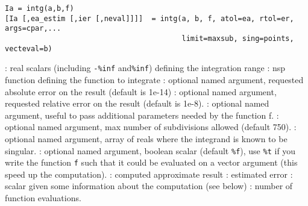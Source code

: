 
\begin{mandesc}
\end{mandesc}

\begin{calling_sequence}
\begin{verbatim}
Ia = intg(a,b,f)
[Ia [,ea_estim [,ier [,neval]]]]  = intg(a, b, f, atol=ea, rtol=er, args=cpar,... 
                                         limit=maxsub, sing=points, vecteval=b)
\end{verbatim}
\end{calling_sequence}
\begin{parameters}
  \begin{varlist}
    :  real scalars (including \verb+-%inf+ and\verb+%inf+) defining the integration range
    : nsp function defining the function to integrate
    : optional named argument, requested absolute error
                      on the result (default is 1e-14)
    : optional named argument, requested relative error
                      on the result (default is 1e-8).
    : optional named argument, useful to pass
    additional parameters needed by the function f.
    : optional named argument, max number of
    subdivisions allowed (default 750).
    : optional named argument, array of reals where the integrand
    is known to be singular.
    : optional named argument, boolean scalar
    (default \verb+%f+), use \verb+%t+ if you write the function
                   \verb+f+ such that it could be evaluated on a
                   vector argument (this speed up the computation).
    : computed approximate result
    : estimated error
    : scalar given some information about the computation (see below)
    : number of function evaluations.
  \end{varlist}
\end{parameters}

